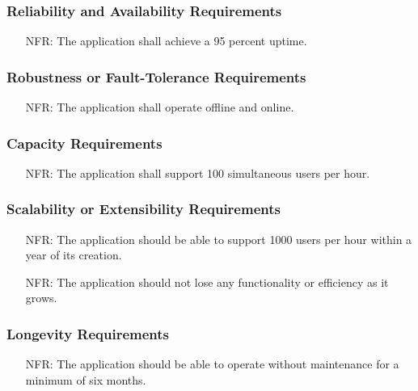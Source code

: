 \documentclass[12pt]{article}
\newcounter{nfrnum} %
\begin{document}
  \subsubsection{Reliability and Availability Requirements}
    \noident\begin{itemize}
      \item[NFR\refstepcounter{nfrnum}\thenfrnum:] 
        The application shall achieve a 95 percent uptime.
    \end{itemize}
  \subsubsection{Robustness or Fault-Tolerance Requirements}
    \noident\begin{itemize}
      \item[NFR\refstepcounter{nfrnum}\thenfrnum:] 
        The application shall operate offline and online.
    \end{itemize}
  \subsubsection{Capacity Requirements}
    \noident\begin{itemize}
      \item[NFR\refstepcounter{nfrnum}\thenfrnum:] 
        The application shall support 100 simultaneous users per hour. 
    \end{itemize}
  \subsubsection{Scalability or Extensibility Requirements}
    \noident\begin{itemize}
      \item[NFR\refstepcounter{nfrnum}\thenfrnum:] 
        The application should be able to support 1000 users per hour within a year of its creation.
      \item[NFR\refstepcounter{nfrnum}\thenfrnum:] 
        The application should not lose any functionality or efficiency as it grows.
    \end{itemize}
  \subsubsection{Longevity Requirements}
    \noident\begin{itemize}
      \item[NFR\refstepcounter{nfrnum}\thenfrnum:] 
        The application should be able to operate without maintenance for a minimum of six months.
    \end{itemize}
\end{document}
